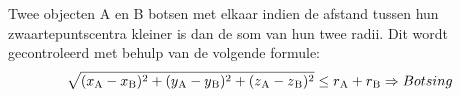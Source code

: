 Twee objecten A en B botsen met elkaar indien de afstand tussen hun zwaartepuntscentra kleiner is dan de som van hun twee radii. Dit wordt gecontroleerd met behulp van de volgende formule:
\begin{equation*}
\sqrt{(x\textsubscript{A}-x\textsubscript{B})\textsuperscript{2} + (y\textsubscript{A} - y\textsubscript{B})\textsuperscript{2} + (z\textsubscript{A} - z\textsubscript{B})\textsuperscript{2}}  \le r\textsubscript{A} + r\textsubscript{B} \Rightarrow Botsing
\end{equation*}
